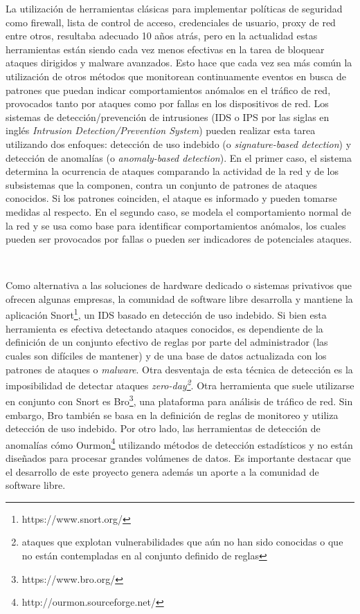 \documentclass[a4paper,12pt, oneside]{article}
\begin{document}
La utilización de herramientas clásicas para implementar políticas de seguridad como firewall, lista de control de acceso, credenciales de usuario, proxy de red entre otros, resultaba adecuado 10 años atrás, pero en la actualidad estas herramientas están siendo cada vez menos efectivas en la tarea de bloquear ataques dirigidos y malware avanzados. Esto hace que cada vez sea más común la utilización de otros métodos que monitorean continuamente eventos en busca de patrones que puedan indicar comportamientos anómalos en el tráfico de red, provocados tanto por ataques como por fallas en los dispositivos de red. Los sistemas de detección/prevención de intrusiones (IDS o IPS por las siglas en inglés \textit{Intrusion Detection/Prevention System}) pueden realizar esta tarea utilizando dos enfoques: detección de uso indebido (o \textit{signature-based detection}) y detección de anomalías (o \textit{anomaly-based detection})\cite{Milenkoski:2015:ECI:2808687.2808691}. En el primer caso, el sistema determina la ocurrencia de ataques comparando la actividad de la red y de los subsistemas que la componen, contra un conjunto de patrones de ataques conocidos. Si los patrones coinciden, el ataque es informado y pueden tomarse medidas al respecto. En el segundo caso, se modela el comportamiento normal de la red y se usa como base para identificar comportamientos anómalos, los cuales pueden ser provocados por fallas o pueden ser indicadores de potenciales ataques.

\

Como alternativa a las soluciones de hardware dedicado o sistemas privativos que ofrecen algunas empresas, la comunidad de software libre desarrolla y mantiene la aplicación Snort\footnote{https://www.snort.org/}, un IDS basado en detección de uso indebido. Si bien esta herramienta es efectiva detectando ataques conocidos, es dependiente de la definición de un conjunto efectivo de reglas por parte del administrador (las cuales son difíciles de mantener) y de una base de datos actualizada con los patrones de ataques o \textit{malware}. Otra desventaja de esta técnica de detección es la imposibilidad de detectar ataques \textit{zero-day\footnote{ataques que explotan vulnerabilidades que aún no han sido conocidas o que no están contempladas en al conjunto definido de reglas}}\cite{Milenkoski:2015:ECI:2808687.2808691}. Otra herramienta que suele utilizarse en conjunto con Snort es Bro\footnote{https://www.bro.org/}, una plataforma para análisis de tráfico de red. Sin embargo, Bro también se basa en la definición de reglas de monitoreo y utiliza detección de uso indebido. Por otro lado, las herramientas de detección de anomalías cómo Ourmon\footnote{http://ourmon.sourceforge.net/} utilizando métodos de detección estadísticos y no están diseñados para procesar grandes volúmenes de datos. Es importante destacar que el desarrollo de este proyecto genera además un aporte a la comunidad de software libre.
\end{document}
